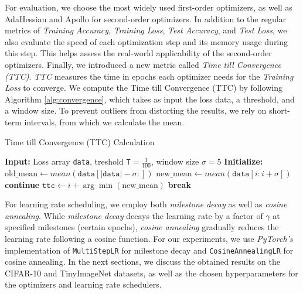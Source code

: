 For evaluation, we choose the most widely used first-order optimizers, as well as AdaHessian and Apollo for second-order
optimizers. In addition to the regular metrics of \emph{Training Accuracy}, \emph{Training Loss},
\emph{Test Accuracy}, and \emph{Test Loss}, we also evaluate the speed of each optimization step and 
its memory usage during this step. This helps assess the real-world applicability of the second-order optimizers.
Finally, we introduced a new metric called \emph{Time till Convergence (TTC)}.
\emph{TTC} measures the time in epochs each optimizer needs for the \emph{Training Loss} to converge.
We compute the Time till Convergence (TTC) by following Algorithm \ref{alg:convergence},
which takes as input the loss data, a threshold, and a window size.
To prevent outliers from distorting the results, we rely on short-term intervals, from which we calculate the mean.
\begin{algorithm}
    \caption{Time till Convergence (TTC) Calculation}
    \label{alg:convergence}

    \begin{algorithmic}[1]
    \State \textbf{Input:} Loss array \texttt{data}, treshold \texttt{T}$=\frac{1}{100}$, window size $\sigma=5$
    \State \textbf{Initialize:} $ \text{old\_mean} \gets mean(\texttt{data}[ \lvert \texttt{data}\rvert -\sigma :] )$ 
    \State $ \text{new\_mean} \gets  mean(\texttt{data}[i:i+\sigma]) $
            \State \textbf{continue}
        \Else
            \State $\texttt{ttc} \gets i + \arg\min (\text{new\_mean})$
            \State \textbf{break}
        \EndIf
    \EndFor
    \end{algorithmic}
    \end{algorithm}
For learning rate scheduling, we employ both \emph{milestone decay} as well as \emph{cosine annealing}.
While \emph{milestone decay} decays the learning rate by a factor of $\gamma$ at
specified milestones (certain epochs), \emph{cosine annealing} gradually reduces the learning rate
following a cosine function.
For our experiments, we use \emph{PyTorch's} implementation of \texttt{MultiStepLR} for milestone decay and
\texttt{CosineAnnealingLR} for cosine annealing.
In the next sections, we discuss the obtained results on the CIFAR-10 and TinyImageNet
datasets, as well as the chosen hyperparameters for the optimizers and learning rate schedulers.

